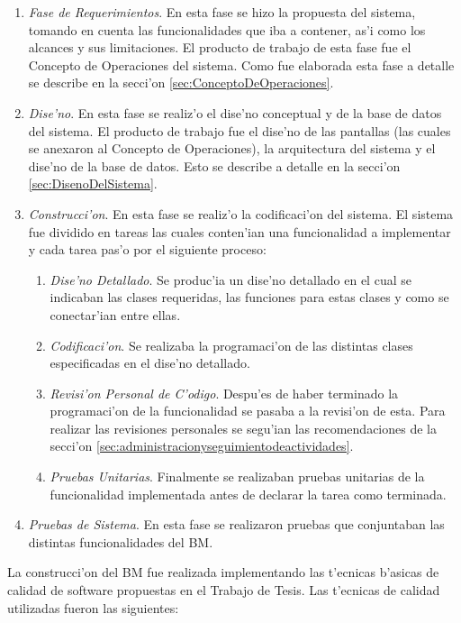 \begin{enumerate}
	\item \emph{Fase de Requerimientos}. En esta fase se hizo la propuesta del sistema, tomando en cuenta las funcionalidades que iba a contener, as'i como los alcances y sus limitaciones. El producto de trabajo de esta fase fue el Concepto de Operaciones del sistema. Como fue elaborada esta fase a detalle se describe en la secci'on \ref{sec:ConceptoDeOperaciones}.
	\item \emph{Dise'no}. En esta fase se realiz'o el dise'no conceptual y de la base de datos del sistema. El producto de trabajo fue el dise'no de las pantallas (las cuales se anexaron al Concepto de Operaciones), la arquitectura del sistema y el dise'no de la base de datos. Esto se describe a detalle en la secci'on \ref{sec:DisenoDelSistema}.
	\item \emph{Construcci'on}. En esta fase se realiz'o la codificaci'on del sistema. El sistema fue dividido en tareas las cuales conten'ian una funcionalidad a implementar y cada tarea pas'o por el siguiente proceso:
	\begin{enumerate}
		\item \emph{Dise'no Detallado}. Se produc'ia un dise'no detallado en el cual se indicaban las clases requeridas, las funciones para estas clases y como se conectar'ian entre ellas.
		\item \emph{Codificaci'on}. Se realizaba la programaci'on de las distintas clases especificadas en el dise'no detallado.
		\item \emph{Revisi'on Personal de C'odigo}. Despu'es de haber terminado la programaci'on de la funcionalidad se pasaba a la revisi'on de esta. Para realizar las revisiones personales se segu'ian las recomendaciones de la secci'on \ref{sec:administracionyseguimientodeactividades}.
		\item \emph{Pruebas Unitarias}. Finalmente se realizaban pruebas unitarias de la funcionalidad implementada antes de declarar la tarea como terminada.
	\end{enumerate}
	\item \emph{Pruebas de Sistema}. En esta fase se realizaron pruebas que conjuntaban las distintas funcionalidades del BM.
\end{enumerate}

La construcci'on del BM fue realizada implementando las t'ecnicas b'asicas de calidad de software propuestas en el Trabajo de Tesis. Las t'ecnicas de calidad utilizadas fueron las siguientes:

